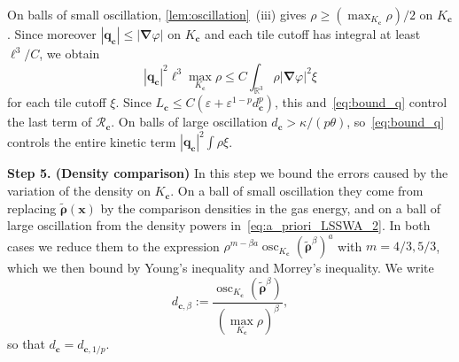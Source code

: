 \documentclass[final,reqno]{amsart}
\theoremstyle{remark}
\renewcommand{\le}{\leqslant}
\renewcommand{\ge}{\geqslant}
\renewcommand{\epsilon}{\varepsilon}
\newcommand{\wt}[1]{\widetilde{#1}}
\newcommand{\RR}{\mathbb{R}}
\newcommand{\grad}{\bm{\nabla}}
\begin{document}
On balls of small oscillation, \cref{lem:oscillation}~(iii) gives $\rho\ge(\max_{K_{\mathbf{c}}}\rho)/2$ on $K_{\mathbf{c}}$. Since moreover $|\mathbf{q}_{\mathbf{c}}|\le|\grad\varphi|$ on $K_{\mathbf{c}}$ and each tile cutoff has integral at least $\ell^3/C$, we obtain
$$
|\mathbf{q}_{\mathbf{c}}|^2\ell^3\max_{K_{\mathbf{c}}}\rho\le C\int_{\RR^3}\rho|\grad\varphi|^2\xi
$$
for each tile cutoff $\xi$. Since $L_{\mathbf{c}}\le C(\epsilon+\epsilon^{1-p}d_{\mathbf{c}}^p)$, this and~\cref{eq:bound_q} control the last term of $\mathcal{R}_{\mathbf{c}}$. On balls of large oscillation $d_{\mathbf{c}}>\kappa/(p\theta)$, so~\cref{eq:bound_q} controls the entire kinetic term $|\mathbf{q}_{\mathbf{c}}|^2\int\rho\xi$.

\medskip

\noindent\textbf{Step 5. (Density comparison)} In this step we bound the errors caused by the variation of the density on $K_{\mathbf{c}}$. On a ball of small oscillation they come from replacing $\wt{\bm{\rho}}(\mathbf{x})$ by the comparison densities in the gas energy, and on a ball of large oscillation from the density powers in~\cref{eq:a_priori_LSSWA_2}. In both cases we reduce them to the expression $\rho^{m-\beta a}\operatorname{osc}_{K_{\mathbf{c}}}(\wt{\bm{\rho}}^\beta)^a$ with $m=4/3,5/3$, which we then bound by Young's inequality and Morrey's inequality. We write
\[
d_{\mathbf{c},\beta}:=\frac{\operatorname{osc}_{K_{\mathbf{c}}}(\wt{\bm{\rho}}^\beta)}{(\max_{K_{\mathbf{c}}}\rho)^\beta},
\]
so that $d_{\mathbf{c}}=d_{\mathbf{c},1/p}$.
\end{document}
